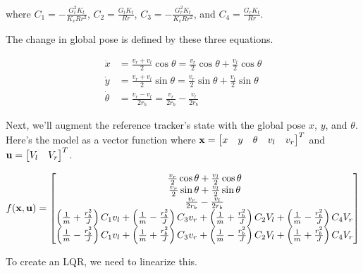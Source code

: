 where $C_1 = -\frac{G_l^2 K_t}{K_v R r^2}$, $C_2 = \frac{G_l K_t}{Rr}$,
$C_3 = -\frac{G_r^2 K_t}{K_v R r^2}$, and $C_4 = \frac{G_r K_t}{Rr}$.

The change in global pose is defined by these three equations.

\begin{align*}
  \dot{x} &= \frac{v_r + v_l}{2}\cos\theta = \frac{v_r}{2}\cos\theta +
    \frac{v_l}{2}\cos\theta \\
  \dot{y} &= \frac{v_r + v_l}{2}\sin\theta = \frac{v_r}{2}\sin\theta +
    \frac{v_l}{2}\sin\theta \\
  \dot{\theta} &= \frac{v_r - v_l}{2r_b} = \frac{v_r}{2r_b} - \frac{v_l}{2r_b}
\end{align*}

Next, we'll augment the reference tracker's state with the global pose $x$, $y$,
and $\theta$. Here's the model as a vector function where
$\mathbf{x} = \begin{bmatrix} x & y & \theta & v_l & v_r \end{bmatrix}^T$ and
$\mathbf{u} = \begin{bmatrix} V_l & V_r \end{bmatrix}^T$.

\begin{equation}
  f(\mathbf{x}, \mathbf{u}) =
  \begin{bmatrix}
    \frac{v_r}{2}\cos\theta + \frac{v_l}{2}\cos\theta \\
    \frac{v_r}{2}\sin\theta + \frac{v_l}{2}\sin\theta \\
    \frac{v_r}{2r_b} - \frac{v_l}{2r_b} \\
    \left(\frac{1}{m} + \frac{r_b^2}{J}\right) C_1 v_l +
      \left(\frac{1}{m} - \frac{r_b^2}{J}\right) C_3 v_r +
      \left(\frac{1}{m} + \frac{r_b^2}{J}\right) C_2 V_l +
      \left(\frac{1}{m} - \frac{r_b^2}{J}\right) C_4 V_r \\
    \left(\frac{1}{m} - \frac{r_b^2}{J}\right) C_1 v_l +
      \left(\frac{1}{m} + \frac{r_b^2}{J}\right) C_3 v_r +
      \left(\frac{1}{m} - \frac{r_b^2}{J}\right) C_2 V_l +
      \left(\frac{1}{m} + \frac{r_b^2}{J}\right) C_4 V_r
  \end{bmatrix}
  \label{eq:linearized_diff_drive_f}
\end{equation}

To create an LQR, we need to linearize this.

